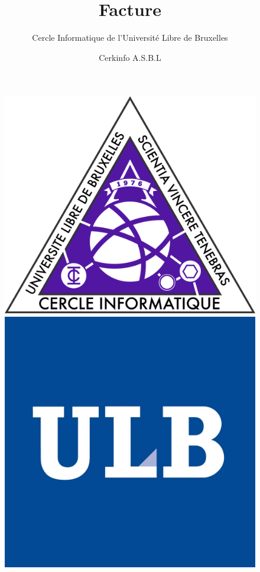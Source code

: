 \documentclass{article}
\title{Facture}
\author{Cercle Informatique de l'Université Libre de Bruxelles}
\date{Cerkinfo A.S.B.L}
\begin{document}
\begin{figure}
	\includegraphics[scale=0.03]{ci.png}
	\hfill
	\includegraphics[scale=0.4]{ulb.png}
  \label{fig:ci}
\end{figure}

\maketitle
\end{document}
